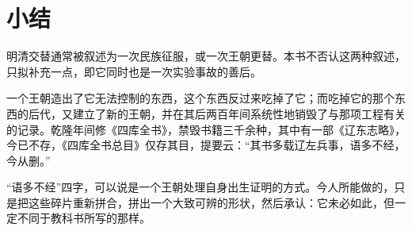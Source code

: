\section{小结}

明清交替通常被叙述为一次民族征服，或一次王朝更替。本书不否认这两种叙述，只拟补充一点，即它同时也是一次实验事故的善后。

一个王朝造出了它无法控制的东西，这个东西反过来吃掉了它；而吃掉它的那个东西的后代，又建立了新的王朝，并在其后两百年间系统性地销毁了与那项工程有关的记录。乾隆年间修《四库全书》，禁毁书籍三千余种，其中有一部《辽东志略》，今已不存，《四库全书总目》仅存其目，提要云：“其书多载辽左兵事，语多不经，今从删。”

“语多不经”四字，可以说是一个王朝处理自身出生证明的方式。今人所能做的，只是把这些碎片重新拼合，拼出一个大致可辨的形状，然后承认：它未必如此，但一定不同于教科书所写的那样。
